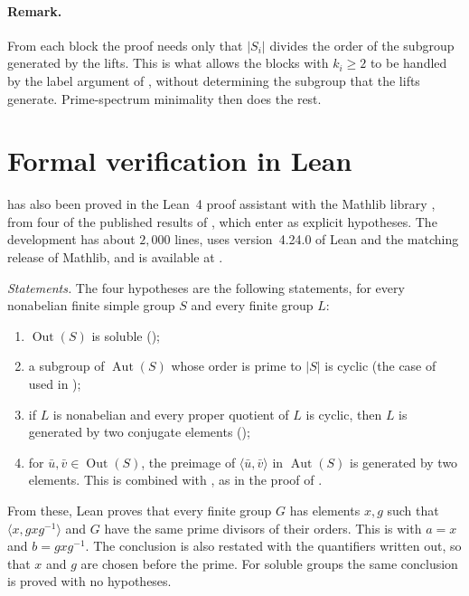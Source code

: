 \documentclass[11pt,colorlinks]{charlie}
\DeclareMathOperator{\Aut}{Aut}
\DeclareMathOperator{\Out}{Out}
\newcommand{\gen}[1]{\langle #1\rangle}
\begin{document}
\paragraph{Remark.}
From each block the proof needs only that $|S_i|$ divides the order of the subgroup generated by the lifts. This is what allows the blocks with $k_i\ge2$ to be handled by the label argument of , without determining the subgroup that the lifts generate. Prime-spectrum minimality then does the rest.

\section{Formal verification in Lean}\label{sec:lean}
 has also been proved in the Lean~4 proof assistant \cite{Lean4} with the Mathlib library \cite{Mathlib}, from four of the published results of , which enter as explicit hypotheses. The development has about $2{,}000$ lines, uses version~4.24.0 of Lean and the matching release of Mathlib, and is available at \coderepo.

\emph{Statements.} The four hypotheses are the following statements, for every nonabelian finite simple group $S$ and every finite group $L$:
\begin{enumerate}
\item $\Out(S)$ is soluble ();
\item a subgroup of $\Aut(S)$ whose order is prime to $|S|$ is cyclic (the case of  used in );
\item if $L$ is nonabelian and every proper quotient of $L$ is cyclic, then $L$ is generated by two conjugate elements ();
\item for $\bar u,\bar v\in\Out(S)$, the preimage of $\gen{\bar u,\bar v}$ in $\Aut(S)$ is generated by two elements. This is  combined with , as in the proof of .
\end{enumerate}
From these, Lean proves that every finite group $G$ has elements $x,g$ such that $\gen{x,gxg^{-1}}$ and $G$ have the same prime divisors of their orders. This is  with $a=x$ and $b=gxg^{-1}$. The conclusion is also restated with the quantifiers written out, so that $x$ and $g$ are chosen before the prime. For soluble groups the same conclusion is proved with no hypotheses.
\end{document}
